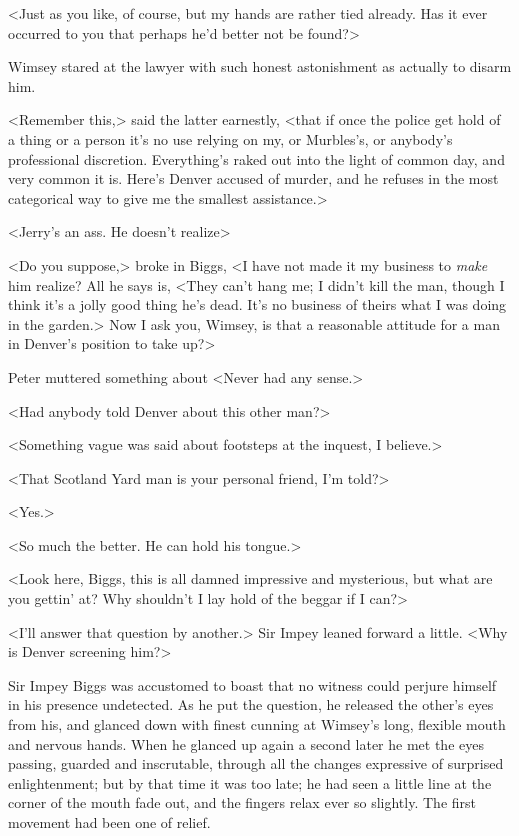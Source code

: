 <Just as you like, of course, but my hands are rather tied already. Has it ever occurred to you that perhaps he'd better not be found?>

Wimsey stared at the lawyer with such honest astonishment as actually to disarm him.

<Remember this,> said the latter earnestly, <that if once the police get hold of a thing or a person it's no use relying on my, or Murbles's, or anybody's professional discretion. Everything's raked out into the light of common day, and very common it is. Here's Denver accused of murder, and he refuses in the most categorical way to give me the smallest assistance.>

<Jerry's an ass. He doesn't realize\longdash>

<Do you suppose,> broke in Biggs, <I have not made it my business to \emph{make} him realize? All he says is, <They can't hang me; I didn't kill the man, though I think it's a jolly good thing he's dead. It's no business of theirs what I was doing in the garden.> Now I ask you, Wimsey, is that a reasonable attitude for a man in Denver's position to take up?>

Peter muttered something about <Never had any sense.>

<Had anybody told Denver about this other man?>

<Something vague was said about footsteps at the inquest, I believe.>

<That Scotland Yard man is your personal friend, I'm told?>

<Yes.>

<So much the better. He can hold his tongue.>

<Look here, Biggs, this is all damned impressive and mysterious, but what are you gettin' at? Why shouldn't I lay hold of the beggar if I can?>

<I'll answer that question by another.> Sir Impey leaned forward a little. <Why is Denver screening him?>

Sir Impey Biggs was accustomed to boast that no witness could perjure himself in his presence undetected. As he put the question, he released the other's eyes from his, and glanced down with finest cunning at Wimsey's long, flexible mouth and nervous hands. When he glanced up again a second later he met the eyes passing, guarded and inscrutable, through all the changes expressive of surprised enlightenment; but by that time it was too late; he had seen a little line at the corner of the mouth fade out, and the fingers relax ever so slightly. The first movement had been one of relief.


